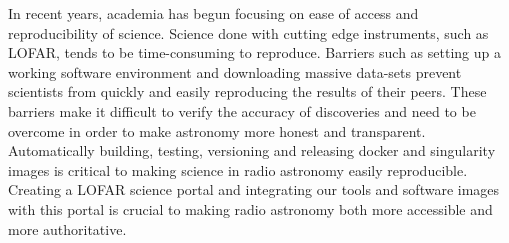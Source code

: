 In recent years, academia has begun focusing on ease of access and reproducibility of science. Science done with cutting edge instruments, such as LOFAR, tends to be time-consuming to reproduce. Barriers such as setting up a working software environment and downloading massive data-sets prevent scientists from quickly and easily reproducing the results of their peers. These barriers make it difficult to verify the accuracy of discoveries and need to be overcome in order to make astronomy more honest and transparent. Automatically building, testing, versioning and releasing docker and singularity images is critical to making science in radio astronomy easily reproducible. Creating a LOFAR science portal and integrating our tools and software images with this portal is crucial to making radio astronomy both more accessible and more authoritative.
